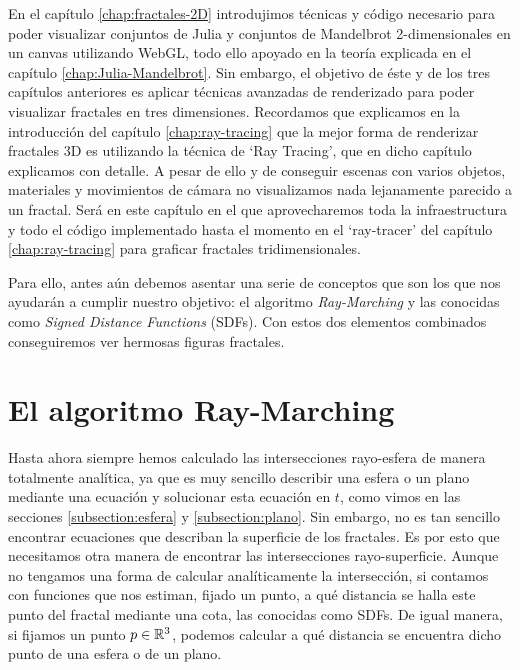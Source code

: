 %
%

En el capítulo \ref{chap:fractales-2D} introdujimos técnicas y código necesario para poder visualizar conjuntos de Julia y conjuntos de Mandelbrot 2-dimensionales en un canvas utilizando WebGL, todo ello apoyado en la teoría explicada en el capítulo \ref{chap:Julia-Mandelbrot}. Sin embargo, el objetivo de éste y de los tres capítulos anteriores es aplicar técnicas avanzadas de renderizado para poder visualizar fractales en tres dimensiones. Recordamos que explicamos en la introducción del capítulo \ref{chap:ray-tracing} que la mejor forma de renderizar fractales 3D es utilizando la técnica de `Ray Tracing', que en dicho capítulo explicamos con detalle. A pesar de ello y de conseguir escenas con varios objetos, materiales y movimientos de cámara no visualizamos nada lejanamente parecido a un fractal. Será en este capítulo en el que aprovecharemos toda la infraestructura y todo el código implementado hasta el momento en el `ray-tracer' del capítulo \ref{chap:ray-tracing} para graficar fractales tridimensionales.

Para ello, antes aún debemos asentar una serie de conceptos que son los que nos ayudarán a cumplir nuestro objetivo: el algoritmo \textit{Ray-Marching} y las conocidas como \textit{Signed Distance Functions} (SDFs). Con estos dos elementos combinados conseguiremos ver hermosas figuras fractales.

\section{El algoritmo Ray-Marching}
\label{section:ray-arching}

Hasta ahora siempre hemos calculado las intersecciones rayo-esfera de manera totalmente analítica, ya que es muy sencillo describir una esfera o un plano mediante una ecuación y solucionar esta ecuación en $t$, como vimos en las secciones \ref{subsection:esfera} y \ref{subsection:plano}. Sin embargo, no es tan sencillo encontrar ecuaciones que describan la superficie de los fractales. Es por esto que necesitamos otra manera de encontrar las intersecciones rayo-superficie. Aunque no tengamos una forma de calcular analíticamente la intersección, si contamos con funciones que nos estiman, fijado un punto, a qué distancia se halla este punto del fractal mediante una cota, las conocidas como SDFs. De igual manera, si fijamos un punto $p\in\mathbb{R}^3$, podemos calcular a qué distancia se encuentra dicho punto de una esfera o de un plano. 

